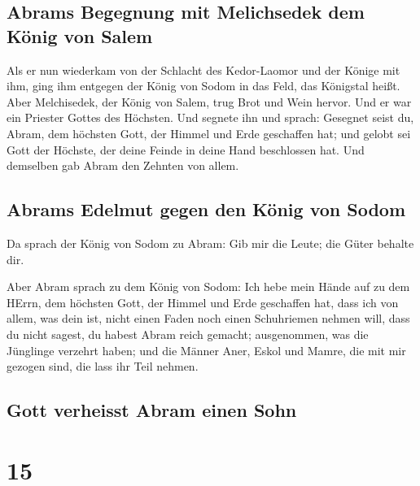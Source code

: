 \hypertarget{abrams-begegnung-mit-melichsedek-dem-kuxf6nig-von-salem}{%
\subsection{Abrams Begegnung mit Melichsedek dem König von
Salem}\label{abrams-begegnung-mit-melichsedek-dem-kuxf6nig-von-salem}}

 Als er nun wiederkam von der Schlacht des Kedor-Laomor
und der Könige mit ihm, ging ihm entgegen der König von Sodom in das
Feld, das Königstal heißt.  Aber Melchisedek, der König
von Salem, trug Brot und Wein hervor. Und er war ein Priester Gottes des
Höchsten.  Und segnete ihn und sprach: Gesegnet seist du,
Abram, dem höchsten Gott, der Himmel und Erde geschaffen hat;
 und gelobt sei Gott der Höchste, der deine Feinde in
deine Hand beschlossen hat. Und demselben gab Abram den Zehnten von
allem.

\hypertarget{abrams-edelmut-gegen-den-kuxf6nig-von-sodom}{%
\subsection{Abrams Edelmut gegen den König von
Sodom}\label{abrams-edelmut-gegen-den-kuxf6nig-von-sodom}}

 Da sprach der König von Sodom zu Abram: Gib mir die
Leute; die Güter behalte dir.

 Aber Abram sprach zu dem König von Sodom: Ich hebe mein
Hände auf zu dem HErrn, dem höchsten Gott, der Himmel und Erde
geschaffen hat,  dass ich von allem, was dein ist, nicht
einen Faden noch einen Schuhriemen nehmen will, dass du nicht sagest, du
habest Abram reich gemacht;  ausgenommen, was die
Jünglinge verzehrt haben; und die Männer Aner, Eskol und Mamre, die mit
mir gezogen sind, die lass ihr Teil nehmen.

\hypertarget{gott-verheisst-abram-einen-sohn}{%
\subsection{Gott verheisst Abram einen
Sohn}\label{gott-verheisst-abram-einen-sohn}}

\hypertarget{section-14}{%
\section{15}\label{section-14}}

